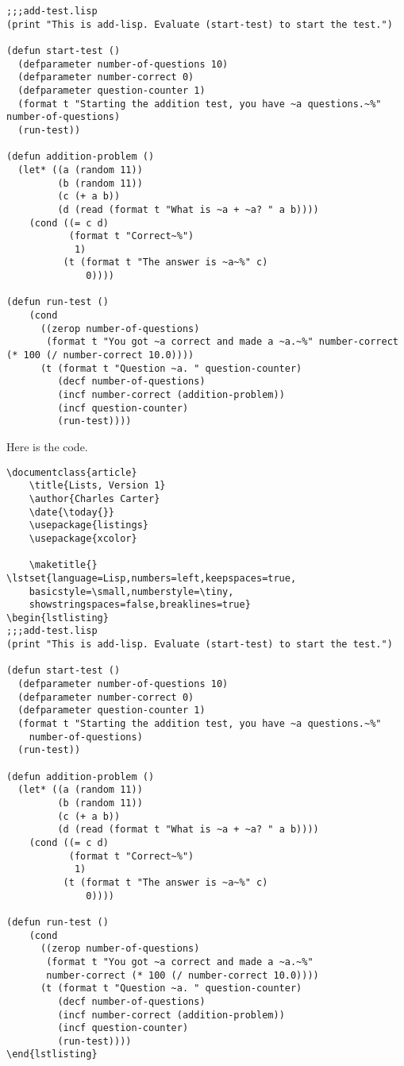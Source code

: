 \lstset{language=Lisp,numbers=left,keepspaces=true,basicstyle=\small,numberstyle=\tiny,showstringspaces=false,breaklines=true}
\begin{lstlisting}
;;;add-test.lisp
(print "This is add-lisp. Evaluate (start-test) to start the test.")

(defun start-test ()
  (defparameter number-of-questions 10)
  (defparameter number-correct 0)
  (defparameter question-counter 1)
  (format t "Starting the addition test, you have ~a questions.~%" number-of-questions)
  (run-test))

(defun addition-problem ()
  (let* ((a (random 11))
         (b (random 11))
         (c (+ a b))
         (d (read (format t "What is ~a + ~a? " a b))))
    (cond ((= c d)
           (format t "Correct~%")
            1)
          (t (format t "The answer is ~a~%" c)
              0))))

(defun run-test ()
    (cond 
      ((zerop number-of-questions)
       (format t "You got ~a correct and made a ~a.~%" number-correct (* 100 (/ number-correct 10.0))))
      (t (format t "Question ~a. " question-counter)
         (decf number-of-questions)
         (incf number-correct (addition-problem))
		 (incf question-counter)
         (run-test))))
\end{lstlisting}

    Here is the code.

        \begin{verbatim}
\documentclass{article}
    \title{Lists, Version 1}
    \author{Charles Carter}
    \date{\today{}}
    \usepackage{listings}
    \usepackage{xcolor}
 
    \maketitle{}
\lstset{language=Lisp,numbers=left,keepspaces=true,
    basicstyle=\small,numberstyle=\tiny,
    showstringspaces=false,breaklines=true}
\begin{lstlisting}
;;;add-test.lisp
(print "This is add-lisp. Evaluate (start-test) to start the test.")

(defun start-test ()
  (defparameter number-of-questions 10)
  (defparameter number-correct 0)
  (defparameter question-counter 1)
  (format t "Starting the addition test, you have ~a questions.~%" 
    number-of-questions)
  (run-test))

(defun addition-problem ()
  (let* ((a (random 11))
         (b (random 11))
         (c (+ a b))
         (d (read (format t "What is ~a + ~a? " a b))))
    (cond ((= c d)
           (format t "Correct~%")
            1)
          (t (format t "The answer is ~a~%" c)
              0))))

(defun run-test ()
    (cond 
      ((zerop number-of-questions)
       (format t "You got ~a correct and made a ~a.~%" 
       number-correct (* 100 (/ number-correct 10.0))))
      (t (format t "Question ~a. " question-counter)
         (decf number-of-questions)
         (incf number-correct (addition-problem))
		 (incf question-counter)
         (run-test))))
\end{lstlisting}
    
        \end{verbatim}

